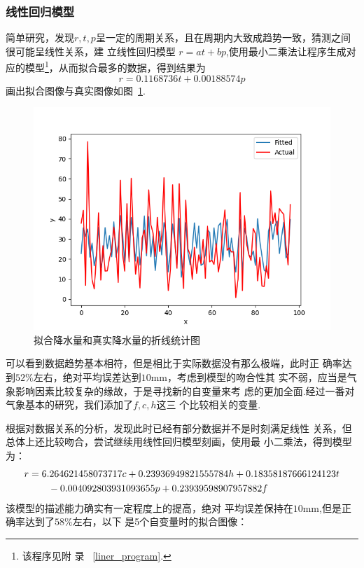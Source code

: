 \documentclass[UTF8, a4paper]{ctexart}
\begin{document}
\subsubsection{线性回归模型}

简单研究，发现$r,t,p$呈一定的周期关系，且在周期内大致成趋势一致，猜测之间很可能呈线性关系，建
立线性回归模型 $r=at+bp$,使用最小二乘法让程序生成对应的模型\footnote{该程序见附
	录~\textcolor{red}{ \ref{liner_program}}.}，从而拟合最多的数据，得到结果为
$$r=0.1168736t+0.00188574p$$画出拟合图像与真实图像如图~\textcolor{red}{\ref{pic7}}.

\begin{figure}[h!]
	\centering
	\includegraphics[scale=0.3]{fit1.png}
	\caption{拟合降水量和真实降水量的折线统计图\label{pic7}}

\end{figure}
可以看到数据趋势基本相符，但是相比于实际数据没有那么极端，此时正
确率达到$52\%$左右，绝对平均误差达到$10$mm，考虑到模型的吻合性其
实不弱，应当是气象影响因素比较复杂的缘故，于是寻找新的自变量来考
虑的更加全面.经过一番对气象基本的研究，我们添加了$f,c,h$这三
个比较相关的变量.

根据对数据关系的分析，发现此时已经有部分数据并不是时刻满足线性
关系，但总体上还比较吻合，尝试继续用线性回归模型刻画，使用最
小二乘法，得到模型为：
\begin{align}
	\notag
	r & =6.264621458073717c+0.23936949821555784h+0.18358187666124123t \\
	\notag
	  & \qquad -0.004092803931093655p+0.23939598907957882f
\end{align}
该模型的描述能力确实有一定程度上的提高，绝对
平均误差保持在$10$mm,但是正确率达到了$58\%$左右，以下
是5个自变量时的拟合图像：
\end{document}
